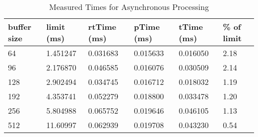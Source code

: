 \begin{table}[H]
\begin{center}
\begin{tabular}{ |p{1.4cm}||p{1.5cm}|p{1.7cm}|p{1.7cm}|p{1.6cm}|p{1.4cm}|  }
 \hline
 buffer size    & limit (ms)    & rtTime (ms)   & pTime (ms)    & tTime (ms) & \% of limit\\
 \hline
 64             & 1.451247      & 0.031683          & 0.015633          & 0.016050      & 2.18 \\
 96             & 2.176870      & 0.046585          & 0.016076          & 0.030509      & 2.14 \\
 128            & 2.902494      & 0.034745          & 0.016712          & 0.018032      & 1.19 \\
 192            & 4.353741      & 0.052279          & 0.018800          & 0.033478      & 1.20 \\
 256            & 5.804988      & 0.065752          & 0.019646          & 0.046105      & 1.13 \\
 512            & 11.60997      & 0.062939          & 0.019708          & 0.043230      & 0.54 \\
 \hline
\end{tabular}
\end{center}
\caption{Measured Times for Asynchronous Processing}
\label{tab:latency_async}
\end{table}